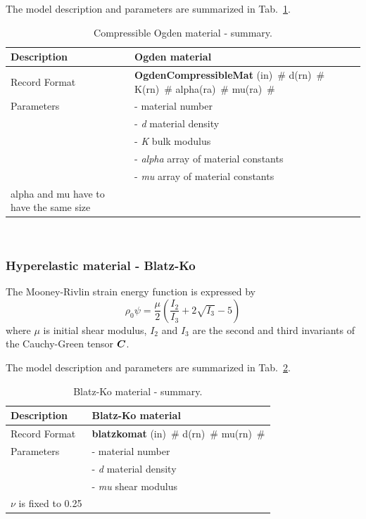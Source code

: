 \documentclass[a4paper]{article}
\newcommand{\mbf}[1]{\mbox{\boldmath$#1$}}
\newcommand{\descitem}[1]{{\noindent \bf #1}}
\newcommand{\elemparam}[2]{{{#1\tiny (#2)}~\#}}
\newcommand{\param}[1]{{\it #1}}
\newenvironment{mmt}{\begin{tabular}{|l|p{9cm}|}}{\end{tabular}\\}
\newenvironment{mmt}{\begin{tabular}{|l|l|}}{\end{tabular}\\}
\begin{document}
The model description and parameters are summarized in Tab.~\ref{CompressibleOgden_table}.
\begin{table}[!htb]
	\begin{mmt}
		\hline
		Description & Ogden material\\
		\hline
		Record Format & \descitem{OgdenCompressibleMat}  \elemparam{}{in}
		\elemparam{d}{rn} \elemparam{K}{rn} \elemparam{alpha}{ra} \elemparam{mu}{ra}\\
		Parameters &- \param{} material number\\
		&- \param{d} material density\\
		&- \param{K} bulk modulus\\
		&- \param{alpha} array of material constants\\
		&- \param{mu} array of material constants\\
                alpha and mu have to have the same size\\
		\hline
	\end{mmt}
	\caption{Compressible Ogden material - summary.}
	\label{CompressibleOgden_table}
\end{table}


\subsubsection{Hyperelastic material - Blatz-Ko}
The Mooney-Rivlin strain energy function is expressed by
\begin{equation}\label{freeEnergyBlatzKo}
\rho_0 \psi = \frac{\mu}{2}\left(\frac{I_2}{I_3} + 2\sqrt{I_3}-5 \right)
\end{equation}
where $\mu$ is initial shear modulus, $I_2$ and $I_3$ are the second and third invariants of the Cauchy-Green tensor $\mbf{C}$.

The model description and parameters are summarized in Tab.~\ref{BlatzKo_table}.
\begin{table}[!htb]
	\begin{mmt}
		\hline
		Description & Blatz-Ko material\\
		\hline
		Record Format & \descitem{blatzkomat}  \elemparam{}{in}
		\elemparam{d}{rn} \elemparam{mu}{rn}\\
		Parameters &- \param{} material number\\
		&- \param{d} material density\\
		&- \param{mu} shear modulus\\
                $\nu$ is fixed to 0.25\\
		\hline
	\end{mmt}
	\caption{Blatz-Ko material - summary.}
	\label{BlatzKo_table}
\end{table}
\end{document}
